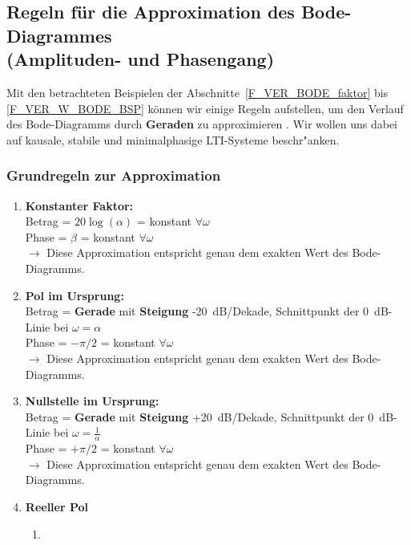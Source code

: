 {\subsection{Regeln f\"ur die Approximation des Bode-Diagrammes\\ (Amplituden- und Phasengang)}
Mit den betrachteten Beispielen der Abschnitte~\ref{F_VER_BODE_faktor}
bis \ref{F_VER_W_BODE_BSP} k\"onnen wir einige Regeln aufstellen, um
den Verlauf des Bode-Diagramms durch {\bf Geraden} zu
approximieren \cite{FRE:BOS:04, GIR:RAB:STE:05, UNB:81}. Wir wollen uns dabei auf kausale, stabile und minimalphasige LTI-Systeme beschr"anken.

\subsubsection{Grundregeln zur Approximation}
\begin{enumerate}
\item{} {\bf Konstanter Faktor:} \\ 
        Betrag = $20\log(\alpha)$ = konstant $\forall\omega$\\
        Phase = $\beta$ = konstant $\forall\omega$\\
        $\rightarrow$ Diese Approximation entspricht genau dem exakten Wert des Bode-Diagramms.
\item{} {\bf Pol im Ursprung:}  \\
        Betrag = {\bf Gerade} mit {\bf Steigung} -20~dB/Dekade, Schnittpunkt der 0~dB-Linie bei $\omega=\alpha$\\
        Phase = $-\pi/2$ = konstant $\forall\omega$\\
        $\rightarrow$ Diese Approximation entspricht genau dem exakten Wert des Bode-Diagramms.
\item{} {\bf Nullstelle im Ursprung:}  \\
        Betrag = {\bf Gerade} mit {\bf Steigung} +20~dB/Dekade, Schnittpunkt der 0~dB-Linie bei $\omega=\frac{1}{\alpha}$\\
        Phase = $+\pi/2$ = konstant $\forall\omega$\\
        $\rightarrow$ Diese Approximation entspricht genau dem exakten Wert des Bode-Diagramms.
      \item{} {\bf Reeller Pol} 
        \begin{enumerate}\item{} \\

\end{enumerate}
\end{enumerate}}
